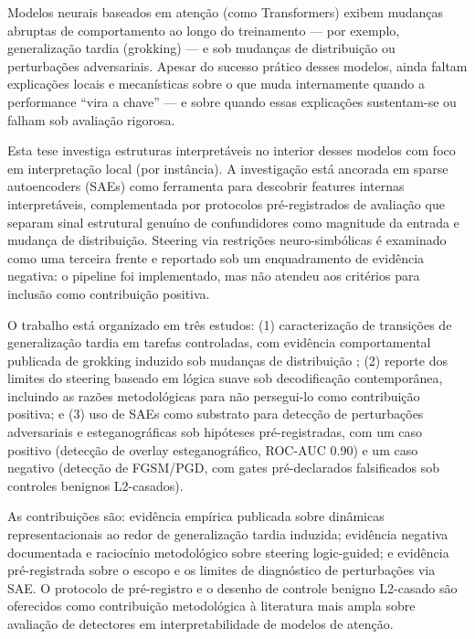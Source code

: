 ﻿\documentclass[../ppgc-tese.tex]{subfiles}
\begin{document}
\begin{translatedabstract}
Modelos neurais baseados em atenção (como Transformers) exibem mudanças abruptas de comportamento ao longo do treinamento --- por exemplo, generalização tardia (grokking) --- e sob mudanças de distribuição ou perturbações adversariais. Apesar do sucesso prático desses modelos, ainda faltam explicações locais e mecanísticas sobre o que muda internamente quando a performance ``vira a chave'' --- e sobre quando essas explicações sustentam-se ou falham sob avaliação rigorosa.

Esta tese investiga estruturas interpretáveis no interior desses modelos com foco em interpretação local (por instância). A investigação está ancorada em sparse autoencoders (SAEs) como ferramenta para descobrir features internas interpretáveis, complementada por protocolos pré-registrados de avaliação que separam sinal estrutural genuíno de confundidores como magnitude da entrada e mudança de distribuição. Steering via restrições neuro-simbólicas é examinado como uma terceira frente e reportado sob um enquadramento de evidência negativa: o pipeline foi implementado, mas não atendeu aos critérios para inclusão como contribuição positiva.

O trabalho está organizado em três estudos: (1) caracterização de transições de generalização tardia em tarefas controladas, com evidência comportamental publicada de grokking induzido sob mudanças de distribuição \cite{carvalho2025inducing_grokking_distribution_shifts}; (2) reporte dos limites do steering baseado em lógica suave sob decodificação contemporânea, incluindo as razões metodológicas para não persegui-lo como contribuição positiva; e (3) uso de SAEs como substrato para detecção de perturbações adversariais e esteganográficas sob hipóteses pré-registradas, com um caso positivo (detecção de overlay esteganográfico, ROC-AUC 0.90) e um caso negativo (detecção de FGSM/PGD, com gates pré-declarados falsificados sob controles benignos L2-casados).

As contribuições são: evidência empírica publicada sobre dinâmicas representacionais ao redor de generalização tardia induzida; evidência negativa documentada e raciocínio metodológico sobre steering logic-guided; e evidência pré-registrada sobre o escopo e os limites de diagnóstico de perturbações via SAE. O protocolo de pré-registro e o desenho de controle benigno L2-casado são oferecidos como contribuição metodológica à literatura mais ampla sobre avaliação de detectores em interpretabilidade de modelos de atenção.
\end{translatedabstract}
\end{document}
